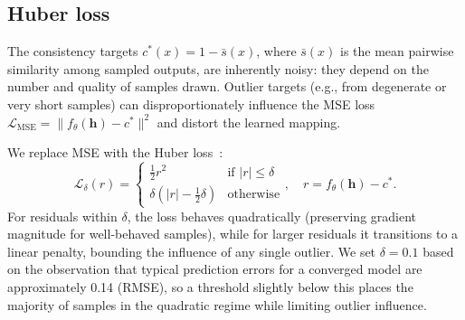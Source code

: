 \subsection{Huber loss}
\label{sec:huber}

The consistency targets $c^*(x) = 1 - \bar{s}(x)$, where $\bar{s}(x)$ is the mean pairwise similarity among sampled outputs, are inherently noisy: they depend on the number and quality of samples drawn.
Outlier targets (e.g., from degenerate or very short samples) can disproportionately influence the MSE loss $\mathcal{L}_{\mathrm{MSE}} = \|f_\theta(\mathbf{h}) - c^*\|^2$ and distort the learned mapping.

We replace MSE with the Huber loss~\citep{huber1964robust}:
\begin{equation}
  \mathcal{L}_\delta(r) =
  \begin{cases}
    \tfrac{1}{2}r^2 & \text{if } |r| \le \delta \\
    \delta(|r| - \tfrac{1}{2}\delta) & \text{otherwise}
  \end{cases},
  \quad r = f_\theta(\mathbf{h}) - c^*.
  \label{eq:huber}
\end{equation}
For residuals within $\delta$, the loss behaves quadratically (preserving gradient magnitude for well-behaved samples), while for larger residuals it transitions to a linear penalty, bounding the influence of any single outlier.
We set $\delta = 0.1$ based on the observation that typical prediction errors for a converged model are approximately 0.14 (RMSE), so a threshold slightly below this places the majority of samples in the quadratic regime while limiting outlier influence.
